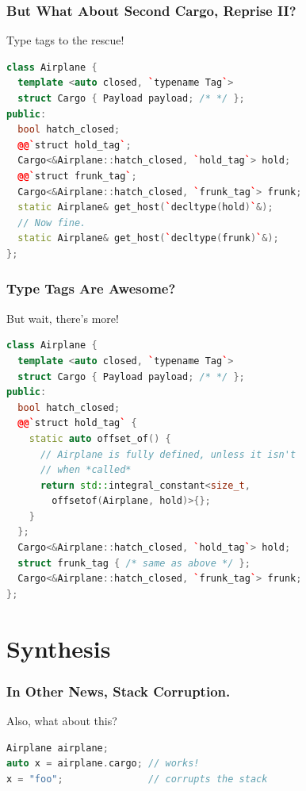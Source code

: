 \documentclass{beamer}
\begin{document}
\begin{frame}[fragile]
\frametitle{But What About Second Cargo, Reprise II?}
\begin{center}
  Type tags to the rescue!
\end{center}
\begin{lstlisting}[language=cpp]
class Airplane {
  template <auto closed, `typename Tag`>
  struct Cargo { Payload payload; /* */ };
public:
  bool hatch_closed;
  @@`struct hold_tag`;
  Cargo<&Airplane::hatch_closed, `hold_tag`> hold;
  @@`struct frunk_tag`;
  Cargo<&Airplane::hatch_closed, `frunk_tag`> frunk;
  static Airplane& get_host(`decltype(hold)`&);
  // Now fine.
  static Airplane& get_host(`decltype(frunk)`&);
};
\end{lstlisting}
\end{frame}


\begin{frame}[fragile]
\frametitle{Type Tags Are Awesome?}
\begin{center}
  But wait, there's more!
\end{center}
\begin{lstlisting}[language=cpp]
class Airplane {
  template <auto closed, `typename Tag`>
  struct Cargo { Payload payload; /* */ };
public:
  bool hatch_closed;
  @@`struct hold_tag` {
    static auto offset_of() {
      // Airplane is fully defined, unless it isn't
      // when *called*
      return std::integral_constant<size_t,
        offsetof(Airplane, hold)>{};
    }
  };
  Cargo<&Airplane::hatch_closed, `hold_tag`> hold;
  struct frunk_tag { /* same as above */ };
  Cargo<&Airplane::hatch_closed, `frunk_tag`> frunk;
};
\end{lstlisting}
\end{frame}


\section{Synthesis}

\begin{frame}[fragile]
\frametitle{In Other News, Stack Corruption.}
\begin{center}
  Also, what about this?
\end{center}

\begin{lstlisting}[language=cpp]
Airplane airplane;
auto x = airplane.cargo; // works!
x = "foo";               // corrupts the stack
\end{lstlisting}
\end{frame}
\end{document}
